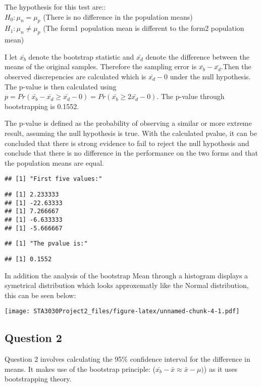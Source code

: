 \documentclass[]{article}
\begin{document}
The hypothesis for this test are::\\
\(H_{0} : \mu_n = \mu_p\) (There is no difference in the population
means)\\
\(H_{1} : \mu_n \ne \mu_p\) (The form1 population mean is different to
the form2 population mean)

I let \(\bar{x_b}\) denote the bootstrap statistic and \(\bar{x_d}\)
denote the difference between the means of the original samples.
Therefore the sampling error is \(\bar{x_b}-\bar{x_d}\).Then the
observed discrepencies are calculated which is \(\bar{x_d}-0\) under the
null hypothesis. The p-value is then calculated using
\(p=Pr(\bar{x_b}-\bar{x_d}\geq \bar{x_d}-0)=Pr(\bar{x_b}\geq2\bar{x_d}-0)\).
The p-value through bootstrapping is 0.1552.

The p-value is defined as the probability of observing a similar or more
extreme result, assuming the null hypothesis is true. With the
calculated pvalue, it can be concluded that there is strong evidence to
fail to reject the null hypothesis and conclude that there is no
difference in the performance on the two forms and that the population
means are equal.

\begin{verbatim}
## [1] "First five values:"
\end{verbatim}

\begin{verbatim}
## [1] 2.233333
## [1] -22.63333
## [1] 7.266667
## [1] -6.633333
## [1] -5.666667
\end{verbatim}

\begin{verbatim}
## [1] "The pvalue is:"
\end{verbatim}

\begin{verbatim}
## [1] 0.1552
\end{verbatim}

In addition the analysis of the bootstrap Mean through a histogram
displays a symetrical distribution which looks approxematly like the
Normal distribution, this can be seen below:

\texttt{[image: STA3030Project2\_files/figure-latex/unnamed-chunk-4-1.pdf]}

\subsection{Question 2}\label{question-2}

Question 2 involves calculating the 95\% confidence interval for the
difference in means. It makes use of the bootstrap principle:
(\(\bar{x_b}-\bar{x}\approx\bar{x}-\mu)\)) as it uses bootstrapping
theory.
\end{document}
